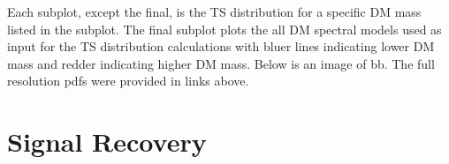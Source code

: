 Each subplot, except the final, is the TS distribution for a specific DM mass listed in the subplot. The final subplot plots the all DM spectral models used as input for the TS distribution calculations with bluer lines indicating lower DM mass and redder indicating higher DM mass.
Below is an image of bb. The full resolution pdfs were provided in links above.

\section{Signal Recovery} \label{sec:icDM_sig_recovery}

\begin{figure}[t]
\end{figure}
